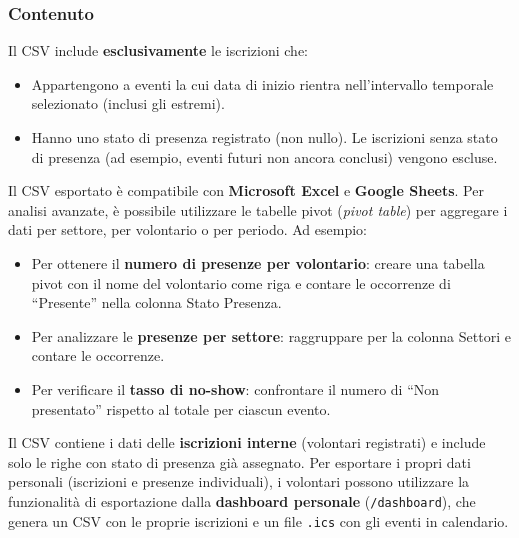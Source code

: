 \documentclass[a4paper,11pt,oneside]{book}
\newcommand{\percorso}[1]{\textcolor{namoCyan}{\texttt{#1}}}
\begin{document}
\subsubsection{Contenuto}

Il CSV include \textbf{esclusivamente} le iscrizioni che:

\begin{itemize}[leftmargin=1.5em]
  \item Appartengono a eventi la cui data di inizio rientra nell'intervallo temporale selezionato (inclusi gli estremi).
  \item Hanno uno stato di presenza registrato (non nullo). Le iscrizioni senza stato di presenza (ad esempio, eventi futuri non ancora conclusi) vengono escluse.
\end{itemize}

\begin{tipbox}
Il CSV esportato \`e compatibile con \textbf{Microsoft Excel} e \textbf{Google Sheets}. Per analisi avanzate, \`e possibile utilizzare le tabelle pivot (\textit{pivot table}) per aggregare i dati per settore, per volontario o per periodo. Ad esempio:
\begin{itemize}[leftmargin=1em]
  \item Per ottenere il \textbf{numero di presenze per volontario}: creare una tabella pivot con il nome del volontario come riga e contare le occorrenze di ``Presente'' nella colonna Stato Presenza.
  \item Per analizzare le \textbf{presenze per settore}: raggruppare per la colonna Settori e contare le occorrenze.
  \item Per verificare il \textbf{tasso di no-show}: confrontare il numero di ``Non presentato'' rispetto al totale per ciascun evento.
\end{itemize}
\end{tipbox}

\begin{infobox}
Il CSV contiene i dati delle \textbf{iscrizioni interne} (volontari registrati) e include solo le righe con stato di presenza gi\`a assegnato. Per esportare i propri dati personali (iscrizioni e presenze individuali), i volontari possono utilizzare la funzionalit\`a di esportazione dalla \textbf{dashboard personale} (\percorso{/dashboard}), che genera un CSV con le proprie iscrizioni e un file \texttt{.ics} con gli eventi in calendario.
\end{infobox}
\end{document}
